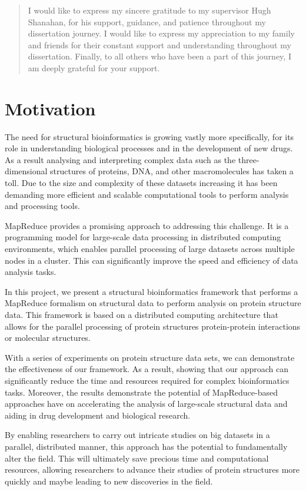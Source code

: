 \documentclass[]{final_report}
\begin{document}
\renewcommand{\abstractname}{Acknowledgements}
\begin{abstract}
    I would like to express my sincere gratitude to my supervisor Hugh Shanahan, for his support, guidance, and patience throughout my dissertation journey. I would like to express my appreciation to my family and friends for their constant support and understanding throughout my dissertation. Finally, to all others who have been a part of this journey, I am deeply grateful for your support.
\end{abstract}

\section{Motivation}
The need for structural bioinformatics is growing vastly more specifically, for its role in understanding biological processes and in the development of new drugs. As a result analysing and interpreting complex data such as the three-dimensional structures of proteins, DNA, and other macromolecules has taken a toll. Due to the size and complexity of these datasets increasing it has been demanding more efficient and scalable computational tools to perform analysis and processing tools.

MapReduce provides a promising approach to addressing this challenge. It is a programming model for large-scale data processing in distributed computing environments, which enables parallel processing of large datasets across multiple nodes in a cluster. This can significantly improve the speed and efficiency of data analysis tasks.

In this project, we present a structural bioinformatics framework that performs a MapReduce formalism on structural data to perform analysis on protein structure data. This framework is based on a distributed computing architecture that allows for the parallel processing of protein structures protein-protein interactions or molecular structures.

With a series of experiments on protein structure data sets, we can demonstrate the effectiveness of our framework. As a result, showing that our approach can significantly reduce the time and resources required for complex bioinformatics tasks. Moreover, the results demonstrate the potential of MapReduce-based approaches have on accelerating the analysis of large-scale structural data and aiding in drug development and biological research.

By enabling researchers to carry out intricate studies on big datasets in a parallel, distributed manner, this approach has the potential to fundamentally alter the field. This will ultimately save precious time and computational resources, allowing researchers to advance their studies of protein structures more quickly and maybe leading to new discoveries in the field.
\clearpage
\end{document}
